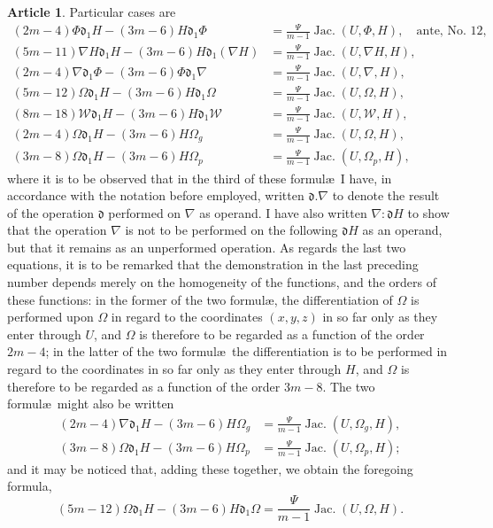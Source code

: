 \documentclass[12pt,a4paper]{article}
\theoremstyle{definition}
\newtheorem{art}{Article}[section]
\DeclareMathOperator{\Jac}{Jac.}
\begin{document}
\begin{art}
Particular cases are
\begin{align*}
(2m - 4)\Phi\mathfrak{d}_1 H - (3m - 6)H\mathfrak{d}_1\Phi &= \frac{\Psi}{m - 1}\Jac(U, \Phi, H), \quad \text{ante, No.~12}, \\
(5m - 11)\nabla H\mathfrak{d}_1 H - (3m - 6)H\mathfrak{d}_1(\nabla H) &= \frac{\Psi}{m - 1}\Jac(U, \nabla H, H), \\
(2m - 4)\nabla \mathfrak{d}_1\Phi - (3m - 6)\Phi\mathfrak{d}_1\nabla &= \frac{\Psi}{m - 1}\Jac(U, \nabla, H), \\
(5m - 12)\Omega\mathfrak{d}_1 H - (3m - 6)H\mathfrak{d}_1\Omega &= \frac{\Psi}{m - 1}\Jac(U, \Omega, H), \\
(8m - 18)\mathcal{W}\mathfrak{d}_1 H - (3m - 6)H\mathfrak{d}_1\mathcal{W} &= \frac{\Psi}{m - 1}\Jac(U, \mathcal{W}, H), \\
(2m - 4)\Omega\mathfrak{d}_1 H - (3m - 6)H\Omega_g &= \frac{\Psi}{m - 1}\Jac(U, \Omega, H), \\
(3m - 8)\Omega\mathfrak{d}_1 H - (3m - 6)H\Omega_p &= \frac{\Psi}{m - 1}\Jac(U, \Omega_p, H),
\end{align*}
where it is to be observed that in the third of these formul\ae\ I have, in accordance with the notation before employed, written $\mathfrak{d}.\nabla$ to denote the result of the operation $\mathfrak{d}$ performed on $\nabla$ as operand. I have also written $\nabla : \mathfrak{d}H$ to show that the operation $\nabla$ is not to be performed on the following $\mathfrak{d}H$ as an operand, but that it remains as an unperformed operation. As regards the last two equations, it is to be remarked that the demonstration in the last preceding number depends merely on the homogeneity of the functions, and the orders of these functions: in the former of the two formul\ae, the differentiation of $\Omega$ is performed upon $\Omega$ in regard to the coordinates $(x, y, z)$ in so far only as they enter through $U$, and $\Omega$ is therefore to be regarded as a function of the order $2m - 4$; in the latter of the two formul\ae\ the differentiation is to be performed in regard to the coordinates in so far only as they enter through $H$, and $\Omega$ is therefore to be regarded as a function of the order $3m - 8$. The two formul\ae\ might also be written
\begin{align*}
(2m - 4)\nabla\mathfrak{d}_1 H - (3m - 6)H\Omega_g &= \frac{\Psi}{m - 1}\Jac(U, \Omega_g, H), \\
(3m - 8)\Omega\mathfrak{d}_1 H - (3m - 6)H\Omega_p &= \frac{\Psi}{m - 1}\Jac(U, \Omega_p, H);
\end{align*}
and it may be noticed that, adding these together, we obtain the foregoing formula,
\[
(5m - 12)\Omega\mathfrak{d}_1 H - (3m - 6)H\mathfrak{d}_1\Omega = \frac{\Psi}{m - 1}\Jac(U, \Omega, H).
\]
\end{art}
\end{document}
